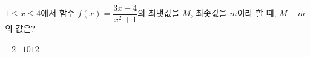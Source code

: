 $1\le x\le 4$에서 함수 $f(x)=\dfrac{3x-4}{x^2+1}$의 최댓값을 $M$, 최솟값을 $m$이라 할 때, $M-m$의 값은?
\begin{choices32}{$-2$}{$-1$}{$0$}{$1$}{$2$}\end{choices32}
